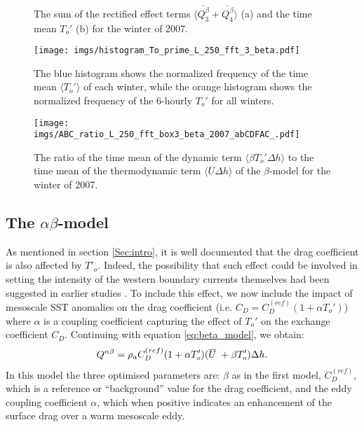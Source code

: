 \begin{figure}[tb]
    \caption{The sum of the rectified effect terms $\langle\overline{Q^\beta_3}+\overline{Q^\beta_4}\rangle$ (a) and the time mean $T_o'$ (b) for the winter of 2007.
    \label{fig:ABC_comp_To_2007}}
\end{figure}


\begin{figure}[tb]
    \centering
    \texttt{[image: imgs/histogram\_To\_prime\_L\_250\_fft\_3\_beta.pdf]}
    \caption{The blue histogram shows the normalized frequency of the time mean $\langle T_o'\rangle$ of each winter, while the orange histogram shows the normalized frequency of the 6-hourly $T_o'$ for all winters.}
    \label{fig:histogram_Toprime}
\end{figure}

\begin{figure}[tb]
    \centering
    \texttt{[image: imgs/ABC\_ratio\_L\_250\_fft\_box3\_beta\_2007\_abCDFAC\_.pdf]}
    \caption{The ratio of the time mean of the dynamic term $\langle \beta T_o' \Delta h \rangle$ to the time mean of the thermodynamic term $\langle \overline{U} \Delta h\rangle $ of the $\beta$-model for the winter of 2007.}
    \label{fig:ratio_Q_eddy_Q_noeddy}
\end{figure}



\subsection{The $\alpha\beta$-model}
As mentioned in section \ref{Sec:intro}, it is well documented that the drag coefficient is also affected by $T'_o$. Indeed, the possibility that such effect could be involved in setting the intensity of the western boundary currents themselves had been suggested in earlier studies \citep{behringer1979thermal}. To include this effect, we now include the impact of mesoscale SST anomalies on the drag coefficient (i.e. $C_D = C_D^{(ref)}(1+\alpha T_o')$) where $\alpha$ is a coupling coefficient capturing the effect of $T_o'$ on the exchange coefficient $C_D$. Continuing with equation \ref{eq:beta_model}, we obtain: 
\begin{align}
    Q^{\alpha\beta} = \rho_a C_D^{(ref)}(1+\alpha T_o')(\overline{U}\hspace*{1mm}+\beta T_o')\Delta h.
\end{align}
In this model the three optimised parameters are: $\beta$ as in the first model, $C_D^{(ref)}$, which is a reference or ``background'' value for the drag coefficient, and the eddy coupling coefficient $\alpha$, which when positive indicates an enhancement of the surface drag over a warm mesoscale eddy. 

